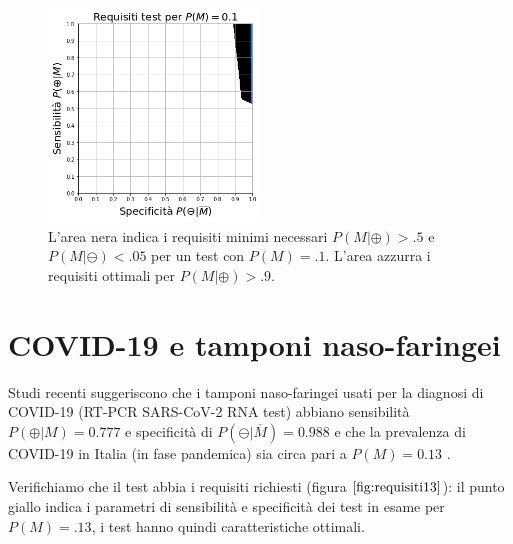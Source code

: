 \documentclass[11pt]{article}
\begin{document}
    
    
        \begin{figure}
        \centering
            \includegraphics[width=0.5\textwidth,height=0.5\textheight,keepaspectratio]{requisiti10.png}
            \caption{L'area nera indica i requisiti minimi necessari $P(M|\oplus)>.5$ e $P(M|\ominus)<.05$ per un test con $P(M)=.1$. L'area azzurra i requisiti ottimali per $P(M|\oplus)>.9$.}
            \label{fig:requisiti10}
        \end{figure}

    
    \hypertarget{covid-19-e-tamponi-naso-faringei}{%
\section{COVID-19 e tamponi
naso-faringei}\label{covid-19-e-tamponi-naso-faringei}}

Studi recenti suggeriscono che i tamponi naso-faringei usati per la
diagnosi di COVID-19 (RT-PCR SARS-CoV-2 RNA test) abbiano sensibilità
\(P(\oplus|M)=0.777\) e specificità di \(P(\ominus|\overline{M})=0.988\)
\cite{padhye2020reconstructed} e che la prevalenza di COVID-19 in Italia
(in fase pandemica) sia circa pari a \(P(M)=0.13\)
\cite{ceylan2020estimation} \cite{vollmer2020sub}
\cite{flaxman2020report}.

Verifichiamo che il test abbia i requisiti richiesti (figura
\(\ref{fig:requisiti13}\)): il punto giallo indica i parametri di
sensibilità e specificità dei test in esame per \(P(M)=.13\), i test
hanno quindi caratteristiche ottimali.
\end{document}
